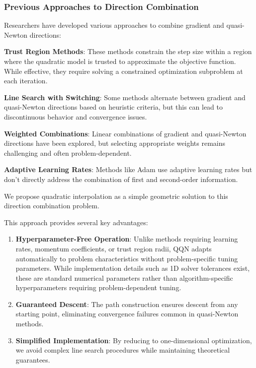 \hypertarget{previous-approaches-to-direction-combination}{%
\subsubsection{Previous Approaches to Direction Combination}\label{previous-approaches-to-direction-combination}}

Researchers have developed various approaches to combine gradient and quasi-Newton directions:

\textbf{Trust Region Methods}: These methods constrain the step size within a region where the quadratic model is trusted to approximate the objective function. While effective, they require solving a constrained optimization subproblem at each iteration.

\textbf{Line Search with Switching}: Some methods alternate between gradient and quasi-Newton directions based on heuristic criteria, but this can lead to discontinuous behavior and convergence issues.

\textbf{Weighted Combinations}: Linear combinations of gradient and quasi-Newton directions have been explored, but selecting appropriate weights remains challenging and often problem-dependent.

\textbf{Adaptive Learning Rates}: Methods like Adam use adaptive learning rates but don't directly address the combination of first and second-order information.

We propose quadratic interpolation as a simple geometric solution to this direction combination problem.

This approach provides several key advantages:

\begin{enumerate}
\def\labelenumi{\arabic{enumi}.}
\item
  \textbf{Hyperparameter-Free Operation}: Unlike methods requiring learning rates, momentum coefficients, or trust region radii, QQN adapts automatically to problem characteristics without problem-specific tuning parameters.
  While implementation details such as 1D solver tolerances exist, these are standard numerical parameters rather than algorithm-specific hyperparameters requiring problem-dependent tuning.
\item
  \textbf{Guaranteed Descent}: The path construction ensures descent from any starting point, eliminating convergence failures common in quasi-Newton methods.
\item
  \textbf{Simplified Implementation}: By reducing to one-dimensional optimization, we avoid complex line search procedures while maintaining theoretical guarantees.
\end{enumerate}

